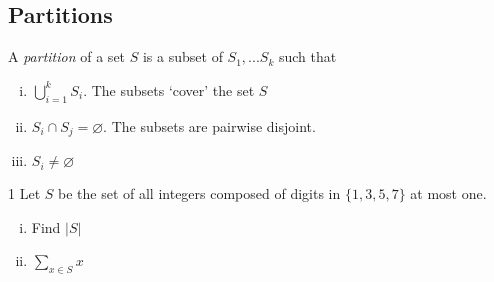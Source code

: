 \label{04-0205}

% 






% 




\subsection{Partitions}
    A \textit{partition} of a set $S$ is a subset of $S_1, ... S_k$ such that
\begin{enumerate}[(i)]
        \item $\bigcup\limits_{i=1}^{k} S_{i}$. The subsets `cover' the set $S$
        \item $S_i 	\cap S_j = \varnothing$. The subsets are pairwise disjoint.
        \item $S_i \neq \varnothing$
\end{enumerate}

\begin{problem}
    1 Let $S$ be the set of all integers composed of digits in $\{1, 3, 5, 7\}$ at most one.
    
    \begin{enumerate}[(i)]
        \item Find $|S|$
        \item $\sum\limits_{x \in S} x$
    \end{enumerate}
\end{problem}


